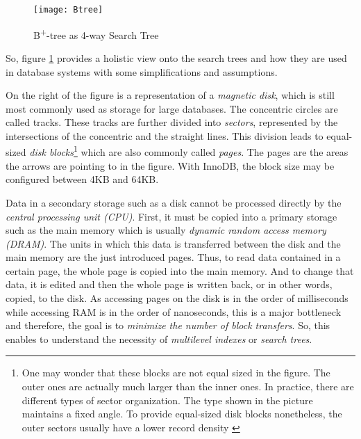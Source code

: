 \begin{figure}[H]
	\centering
	\texttt{[image: Btree]}
	\caption[B\textsuperscript{+}-tree as 4-way Search Tree]{B\textsuperscript{+}-tree as 4-way Search Tree }
	\label{fig:B+tree}
\end{figure}

So, figure \ref{fig:B+tree} provides a holistic view onto the search trees and how they are used in database systems with some simplifications and assumptions.\par 
On the right of the figure is a representation of a \emph{magnetic disk}, which is still most commonly used as storage for large databases. The concentric circles are called tracks. These tracks are further divided into \emph{sectors}, represented by the intersections of the concentric and the straight lines. This division leads to equal-sized \emph{disk blocks}\footnote{One may wonder that these blocks are not equal sized in the figure. The outer ones are actually much larger than the inner ones. In practice, there are different types of sector organization. The type shown in the picture maintains a fixed angle. To provide equal-sized disk blocks nonetheless, the outer sectors usually have a lower record density \cite{DatabaseFundamentals}} which are also commonly called \emph{pages}. The pages are the areas the arrows are pointing to in the figure. With InnoDB, the block size may be configured between 4KB and 64KB.\par 
Data in a secondary storage such as a disk cannot be processed directly by the \emph{central processing unit (CPU)}. First, it must be copied into a primary storage such as the main memory which is usually \emph{dynamic random access memory (DRAM)}. The units in which this data is transferred between the disk and the main memory are the just introduced pages. Thus, to read data contained in a certain page, the whole page is copied into the main memory. And to change that data, it is edited and then the whole page is written back, or in other words, copied, to the disk. As accessing pages on the disk is in the order of milliseconds while accessing RAM is in the order of nanoseconds, this is a major bottleneck and therefore, the goal is to \emph{minimize the number of block transfers}. So, this enables to understand the necessity of \emph{multilevel indexes} or \emph{search trees}.\par
